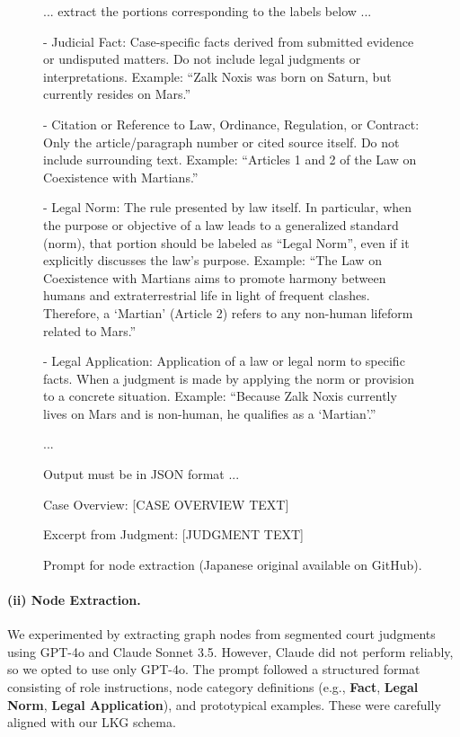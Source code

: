 \documentclass[11pt]{article}
\begin{document}
\begin{figure}[tb]
  \centering
  \begin{tcolorbox}[enhanced, colback=white]
... extract the portions corresponding to the labels below ...

 - Judicial Fact: Case-specific facts derived from submitted evidence or undisputed matters. Do not include legal judgments or interpretations.  
   Example: ``Zalk Noxis was born on Saturn, but currently resides on Mars.''

 - Citation or Reference to Law, Ordinance, Regulation, or Contract: Only the article/paragraph number or cited source itself. Do not include surrounding text.  
   Example: ``Articles 1 and 2 of the Law on Coexistence with Martians.''

 - Legal Norm: The rule presented by law itself. In particular, when the purpose or objective of a law leads to a generalized standard (norm), that portion should be labeled as ``Legal Norm'', even if it explicitly discusses the law’s purpose.  
   Example: ``The Law on Coexistence with Martians aims to promote harmony between humans and extraterrestrial life in light of frequent clashes. Therefore, a `Martian' (Article 2) refers to any non-human lifeform related to Mars.''

 - Legal Application: Application of a law or legal norm to specific facts. When a judgment is made by applying the norm or provision to a concrete situation.  
   Example: ``Because Zalk Noxis currently lives on Mars and is non-human, he qualifies as a `Martian'.''

...

Output must be in JSON format ...

Case Overview:  [CASE OVERVIEW TEXT]

Excerpt from Judgment:   [JUDGMENT TEXT]
  \end{tcolorbox}
\caption{Prompt for node extraction (Japanese original available on GitHub).}
  \label{fig:prompt-node-extraction}
\end{figure}


\paragraph{\textbf{(ii) Node Extraction.}}  

We experimented by extracting graph nodes from segmented court judgments using GPT-4o and Claude Sonnet 3.5. However, Claude did not perform reliably, so we opted to use only GPT-4o. The prompt followed a structured format consisting of role instructions, node category definitions (e.g., \textbf{Fact}, \textbf{Legal Norm}, \textbf{Legal Application}), and prototypical examples. These were carefully aligned with our LKG schema.
\end{document}
